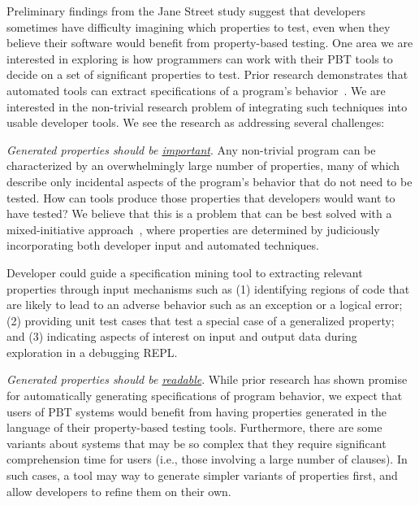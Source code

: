 
 

Preliminary findings from the Jane Street study suggest that developers sometimes have
difficulty imagining which properties to test, even when they believe their
software would benefit from property-based testing. One area we are interested
in exploring is how programmers can work with their PBT tools to decide on a set
of significant properties to test.  Prior research demonstrates that automated
tools can extract specifications of a program's
behavior~\cite{ammons2002mining,le2018deep,claessen2010quickspec}. We are
interested in the non-trivial research problem of integrating such techniques
into usable developer tools. We see the research as addressing several
challenges:

\textit{Generated properties should be \underline{important}}. Any non-trivial
program can be characterized by an overwhelmingly large number of properties,
many of which describe only incidental aspects of the program's behavior that do
not need to be tested. How can tools produce those properties that developers
would want to have tested? We believe that this is a problem that can be best
solved with a mixed-initiative approach~\cite{allen1999mixed}, where properties
are determined by judiciously incorporating both developer input and automated
techniques.

Developer could guide a specification mining tool to extracting relevant
properties through input mechanisms such as (1) identifying regions of code that
are likely to lead to an adverse behavior such as an exception or a logical
error; (2) providing unit test cases that test a special case of a generalized
property; and (3) indicating aspects of interest on input and output data during
exploration in a debugging REPL.

\textit{Generated properties should be \underline{readable}}. While prior research
has shown promise for automatically generating specifications of program
behavior, we expect that users of PBT systems would benefit from having
properties generated in the language of their property-based testing tools.
Furthermore, there are some variants about systems that may be so complex that
they require significant comprehension time for users (i.e., those involving a
large number of clauses). In such cases, a tool may way to generate simpler
variants of properties first, and allow developers to refine them on their own.

